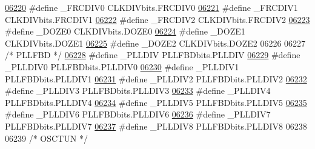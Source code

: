 \begin{DoxyCode}
\hypertarget{a00009_source_l06220}{}\hyperlink{a00009_a9ab43fc11f19f6ddf6fc844ecfd165b4}{06220} \textcolor{preprocessor}{#define \_FRCDIV0 CLKDIVbits.FRCDIV0}
\hypertarget{a00009_source_l06221}{}\hyperlink{a00009_a1a49e61fd42a8d1ca624293bbf8a760e}{06221} \textcolor{preprocessor}{#define \_FRCDIV1 CLKDIVbits.FRCDIV1}
\hypertarget{a00009_source_l06222}{}\hyperlink{a00009_ae9dcde8c8fba30bdec5f58858c2313fe}{06222} \textcolor{preprocessor}{#define \_FRCDIV2 CLKDIVbits.FRCDIV2}
\hypertarget{a00009_source_l06223}{}\hyperlink{a00009_acc952221973448382d4bd598f76ac076}{06223} \textcolor{preprocessor}{#define \_DOZE0 CLKDIVbits.DOZE0}
\hypertarget{a00009_source_l06224}{}\hyperlink{a00009_adaaeae3bdb03b9f12cd58b9551b80a5e}{06224} \textcolor{preprocessor}{#define \_DOZE1 CLKDIVbits.DOZE1}
\hypertarget{a00009_source_l06225}{}\hyperlink{a00009_a878688d85ed4c6e59958f75448d9bfd9}{06225} \textcolor{preprocessor}{#define \_DOZE2 CLKDIVbits.DOZE2}
06226 
06227 \textcolor{comment}{/* PLLFBD */}
\hypertarget{a00009_source_l06228}{}\hyperlink{a00009_acaccef84901b60613b42bd9648cfd0a9}{06228} \textcolor{preprocessor}{#define \_PLLDIV PLLFBDbits.PLLDIV}
\hypertarget{a00009_source_l06229}{}\hyperlink{a00009_a88fa75049dc79ee94352e4247e1139fc}{06229} \textcolor{preprocessor}{#define \_PLLDIV0 PLLFBDbits.PLLDIV0}
\hypertarget{a00009_source_l06230}{}\hyperlink{a00009_a4dbe285638dbd00589a87274c2373a87}{06230} \textcolor{preprocessor}{#define \_PLLDIV1 PLLFBDbits.PLLDIV1}
\hypertarget{a00009_source_l06231}{}\hyperlink{a00009_a105378467c6f05e77043e96c32b7915f}{06231} \textcolor{preprocessor}{#define \_PLLDIV2 PLLFBDbits.PLLDIV2}
\hypertarget{a00009_source_l06232}{}\hyperlink{a00009_a010cfb989a02e202a51f9528136de4cf}{06232} \textcolor{preprocessor}{#define \_PLLDIV3 PLLFBDbits.PLLDIV3}
\hypertarget{a00009_source_l06233}{}\hyperlink{a00009_a7a7063695a13642ae50d03cc9670a2cc}{06233} \textcolor{preprocessor}{#define \_PLLDIV4 PLLFBDbits.PLLDIV4}
\hypertarget{a00009_source_l06234}{}\hyperlink{a00009_ae15176fa5a8db30895a686a38e5c3daa}{06234} \textcolor{preprocessor}{#define \_PLLDIV5 PLLFBDbits.PLLDIV5}
\hypertarget{a00009_source_l06235}{}\hyperlink{a00009_af6186227926d0ab20b67a21d16b659b7}{06235} \textcolor{preprocessor}{#define \_PLLDIV6 PLLFBDbits.PLLDIV6}
\hypertarget{a00009_source_l06236}{}\hyperlink{a00009_aad0739e9d9be0f92209517ac0efdb49c}{06236} \textcolor{preprocessor}{#define \_PLLDIV7 PLLFBDbits.PLLDIV7}
\hypertarget{a00009_source_l06237}{}\hyperlink{a00009_ae973a29b6b1fe5885869e99e0d6d98d3}{06237} \textcolor{preprocessor}{#define \_PLLDIV8 PLLFBDbits.PLLDIV8}
06238 
06239 \textcolor{comment}{/* OSCTUN */}

\end{DoxyCode}
